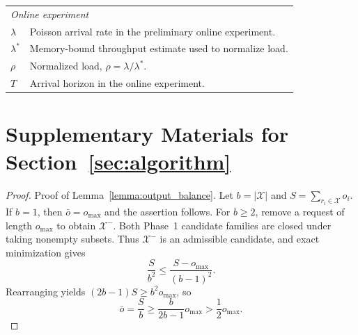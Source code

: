 \documentclass[nonblindrev]{informs3_hide}
\begin{document}
\begin{longtable}{p{}p{}}
\midrule
\multicolumn{2}{l}{\textit{Online experiment}}\\
$\lambda$ & Poisson arrival rate in the preliminary online experiment. \\
$\lambda^*$ & Memory-bound throughput estimate used to normalize load. \\
$\rho$ & Normalized load, $\rho=\lambda/\lambda^*$. \\
$T$ & Arrival horizon in the online experiment. \\
\bottomrule
\end{longtable}


\section{Supplementary Materials for Section~\ref{sec:algorithm}}
\label{append:alg}

\begin{proof}{Proof of Lemma~\ref{lemma:output_balance}.}
Let $b=|\mathcal X|$ and $S=\sum_{r_i\in\mathcal X}o_i$.
If $b=1$, then $\bar o=o_{\max}$ and the assertion follows.
For $b\ge2$, remove a request of length $o_{\max}$ to obtain
$\mathcal X^-$. Both Phase~1 candidate families are closed under taking
nonempty subsets. Thus $\mathcal X^-$ is an admissible candidate, and
exact minimization gives
\[
\frac{S}{b^2}\le\frac{S-o_{\max}}{(b-1)^2}.
\]
Rearranging yields $(2b-1)S\ge b^2o_{\max}$, so
\[
\bar o=\frac Sb\ge\frac{b}{2b-1}o_{\max}>\frac12o_{\max}.
\]
\Halmos
\end{proof}
\end{document}
